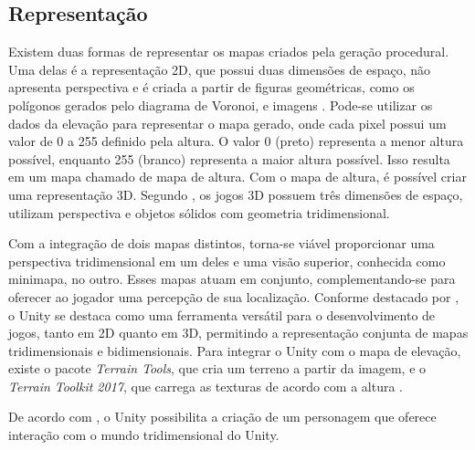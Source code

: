 \subsection{Representação}
\label{subsec:representacao}

Existem duas formas de representar os mapas criados pela geração procedural. Uma delas é a representação 2D, que possui duas dimensões de espaço, não apresenta perspectiva e é criada a partir de figuras geométricas, como os polígonos gerados pelo diagrama de Voronoi, e imagens \cite{unitywebpage}. Pode-se utilizar os dados da elevação para representar o mapa gerado, onde cada pixel possui um valor de 0 a 255 definido pela altura. O valor 0 (preto) representa a menor altura possível, enquanto 255 (branco) representa a maior altura possível. Isso resulta em um mapa chamado de mapa de altura. Com o mapa de altura, é possível criar uma representação 3D. Segundo , os jogos 3D possuem três dimensões de espaço, utilizam perspectiva e objetos sólidos com geometria tridimensional.

Com a integração de dois mapas distintos, torna-se viável proporcionar uma perspectiva tridimensional em um deles e uma visão superior, conhecida como minimapa, no outro. Esses mapas atuam em conjunto, complementando-se para oferecer ao jogador uma percepção de sua localização. Conforme destacado por , o Unity se destaca como uma ferramenta versátil para o desenvolvimento de jogos, tanto em 2D quanto em 3D, permitindo a representação conjunta de mapas tridimensionais e bidimensionais. Para integrar o Unity com o mapa de elevação, existe o pacote \textit{Terrain Tools}, que cria um terreno a partir da imagem, e o \textit{Terrain Toolkit 2017}, que carrega as texturas de acordo com a altura \cite{unity-terrain-tools, unity-terrain-toolkit}.

De acordo com , o Unity possibilita a criação de um personagem que oferece interação com o mundo tridimensional do Unity.
